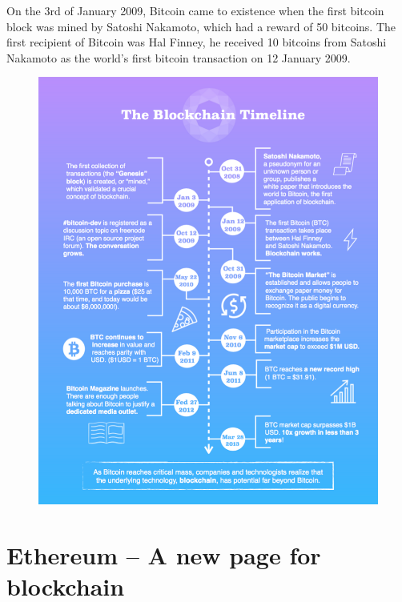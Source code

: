 \documentclass[a4paper]{article}
\begin{document}
	On the 3rd of January 2009, Bitcoin came to existence when the first bitcoin block was mined by Satoshi Nakamoto, which had a reward of 50 bitcoins. The first recipient of Bitcoin was Hal Finney, he received 10 bitcoins from Satoshi Nakamoto as the world's first bitcoin transaction on 12 January 2009.
	\begin{figure}[H]
		\centering
		\includegraphics[width=1\linewidth]{1.png}
	\end{figure}
	
	\section{Ethereum -- A new page for blockchain}
\end{document}
